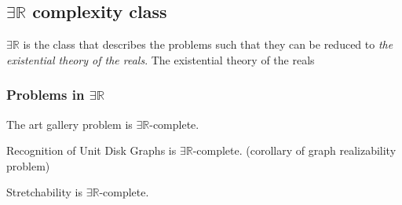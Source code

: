 \subsection{$\exists \mathbb{R}$ complexity class}

$\exists \mathbb{R}$ is the class that describes the problems such that they can be reduced to \textit{the existential theory of the reals}\cite{ExistentialTheoryReals2006}. The existential theory of the reals

\subsubsection{Problems in $\exists \mathbb{R}$}

The art gallery problem is $\exists \mathbb{R}$-complete.\cite{abrahamsenArtGalleryProblem2017}

Recognition of Unit Disk Graphs is $\exists \mathbb{R}$-complete. (corollary of graph realizability problem)\cite{Schaefer2013}

Stretchability is $\exists \mathbb{R}$-complete.
